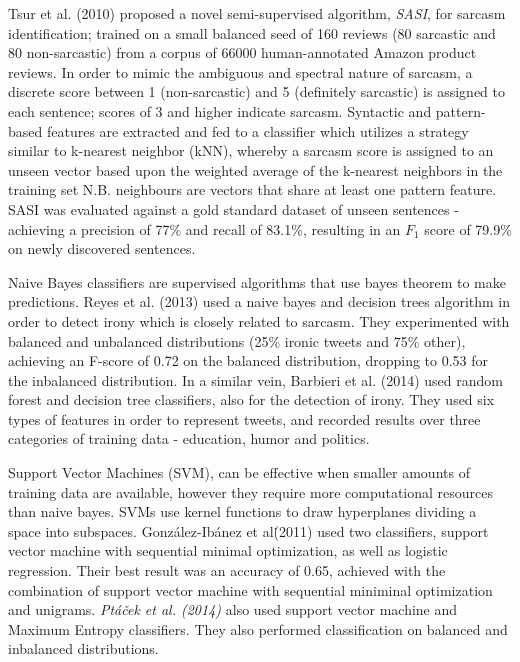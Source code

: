 \documentclass[12pt,a4paper]{article}
\begin{document}
Tsur et al. (2010) \cite{tsur2010icwsm} proposed a novel semi-supervised algorithm, \textit{SASI}, for sarcasm identification; trained on a small balanced seed of 160 reviews (80 sarcastic and 80 non-sarcastic) from a corpus of 66000 human-annotated Amazon product reviews. In order to mimic the ambiguous and spectral nature of sarcasm, a discrete score between 1 (non-sarcastic) and 5 (definitely sarcastic) is assigned to each sentence; scores of 3 and higher indicate sarcasm. Syntactic and pattern-based features are extracted and fed to a classifier which utilizes a strategy similar to k-nearest neighbor (kNN), whereby a sarcasm score is assigned to an unseen vector based upon the weighted average of the k-nearest neighbors in the training set N.B. neighbours are vectors that share at least one pattern feature. SASI was evaluated against a gold standard dataset of unseen sentences - achieving a precision of 77\% and recall of 83.1\%, resulting in an $F_{1}$ score of 79.9\% on newly discovered sentences.

Naive Bayes classifiers are supervised algorithms that use bayes theorem to make predictions. Reyes et al. (2013) \cite{reyes2013multidimensional} used a naive bayes and decision trees algorithm in order to detect irony which is closely related to sarcasm. They experimented with balanced and unbalanced distributions (25\% ironic tweets and 75\% other), achieving an F-score of 0.72 on the balanced distribution, dropping to 0.53 for the inbalanced distribution. In a similar vein, Barbieri et al. (2014) \cite{barbieri2014modelling} used random forest and decision tree classifiers, also for the detection of irony. They used six types of features in order to represent tweets, and recorded results over three categories of training data - education, humor and politics.

Support Vector Machines (SVM), can be effective when smaller amounts of training data are available, however they require more computational resources than naive bayes. SVMs use kernel functions to draw hyperplanes dividing a space into subspaces. Gonz{\'a}lez-Ib{\'a}nez et al\. (2011) \cite{gonzalez2011identifying} used two classifiers, support vector machine with sequential minimal optimization, as well as logistic regression. Their best result was an accuracy of 0.65, achieved with the combination of support vector machine with sequential miniminal optimization and unigrams. \textit{Pt{\'a}{\v{c}ek et al. (2014)}} \cite{ptavcek2014sarcasm} also used support vector machine and Maximum Entropy classifiers. They also performed classification on balanced and inbalanced distributions.
\end{document}
